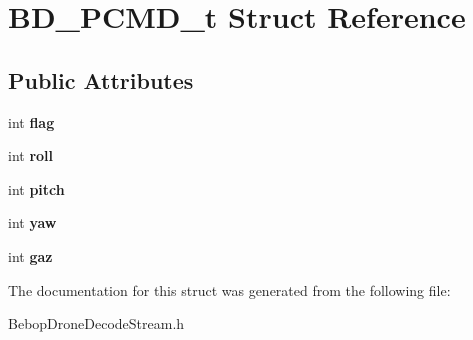 \hypertarget{structBD__PCMD__t}{}\section{B\+D\+\_\+\+P\+C\+M\+D\+\_\+t Struct Reference}
\label{structBD__PCMD__t}
\subsection*{Public Attributes}
\begin{DoxyCompactItemize}
\item 
\hypertarget{structBD__PCMD__t_ae050fb8b4a35994b40ecc87d718b8586}{}int {\bfseries flag}\label{structBD__PCMD__t_ae050fb8b4a35994b40ecc87d718b8586}

\item 
\hypertarget{structBD__PCMD__t_a15248e2d8fcee22535b19b54a247f8e2}{}int {\bfseries roll}\label{structBD__PCMD__t_a15248e2d8fcee22535b19b54a247f8e2}

\item 
\hypertarget{structBD__PCMD__t_aee46ae9d983395de16707dda985104be}{}int {\bfseries pitch}\label{structBD__PCMD__t_aee46ae9d983395de16707dda985104be}

\item 
\hypertarget{structBD__PCMD__t_aa4ca0a4fcb3ea5c1acfbe31c81679b42}{}int {\bfseries yaw}\label{structBD__PCMD__t_aa4ca0a4fcb3ea5c1acfbe31c81679b42}

\item 
\hypertarget{structBD__PCMD__t_a174a572d645aebfe34e086312f6efdf2}{}int {\bfseries gaz}\label{structBD__PCMD__t_a174a572d645aebfe34e086312f6efdf2}

\end{DoxyCompactItemize}


The documentation for this struct was generated from the following file\+:\begin{DoxyCompactItemize}
\item 
Bebop\+Drone\+Decode\+Stream.\+h\end{DoxyCompactItemize}
